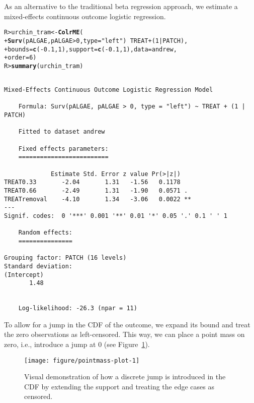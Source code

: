 \documentclass[11pt]{article}\usepackage[]{graphicx}\usepackage{xcolor}
\makeatletter
\newcommand{\hlnum}[1]{\textcolor[rgb]{0.686,0.059,0.569}{#1}}%
\newcommand{\hlstr}[1]{\textcolor[rgb]{0.192,0.494,0.8}{#1}}%
\newcommand{\hlopt}[1]{\textcolor[rgb]{0,0,0}{#1}}%
\newcommand{\hlstd}[1]{\textcolor[rgb]{0.345,0.345,0.345}{#1}}%
\newcommand{\hlkwb}[1]{\textcolor[rgb]{0.69,0.353,0.396}{#1}}%
\newcommand{\hlkwc}[1]{\textcolor[rgb]{0.333,0.667,0.333}{#1}}%
\newcommand{\hlkwd}[1]{\textcolor[rgb]{0.737,0.353,0.396}{\textbf{#1}}}%
\newenvironment{kframe}{%
 \def\at@end@of@kframe{}%
 \ifinner\ifhmode%
  \def\at@end@of@kframe{\end{minipage}}%
  \begin{minipage}{\columnwidth}%
 \fi\fi%
 \def\FrameCommand##1{\hskip\@totalleftmargin \hskip-\fboxsep
 \colorbox{shadecolor}{##1}\hskip-\fboxsep
     \hskip-\linewidth \hskip-\@totalleftmargin \hskip\columnwidth}%
 \MakeFramed {\advance\hsize-\width
   \@totalleftmargin\z@ \linewidth\hsize
   \@setminipage}}%
 {\par\unskip\endMakeFramed%
 \at@end@of@kframe}
\newenvironment{knitrout}{}{} %
\newcommand{\0}{{\mathbf{0}}}
\makeatother
\begin{document}
As an alternative to the traditional beta regression approach,
we estimate a mixed-effects continuous outcome logistic regression.
%
\begin{knitrout}\small
{}\color{fgcolor}\begin{kframe}
\begin{alltt}
\hlstd{R> }\hlstd{urchin_tram} \hlkwb{<-} \hlkwd{ColrME}\hlstd{(}
\hlstd{+  }  \hlkwd{Surv}\hlstd{(pALGAE, pALGAE} \hlopt{>} \hlnum{0}\hlstd{,} \hlkwc{type} \hlstd{=} \hlstr{"left"}\hlstd{)} \hlopt{~} \hlstd{TREAT} \hlopt{+} \hlstd{(}\hlnum{1} \hlopt{|} \hlstd{PATCH),}
\hlstd{+  }  \hlkwc{bounds} \hlstd{=} \hlkwd{c}\hlstd{(}\hlopt{-}\hlnum{0.1}\hlstd{,} \hlnum{1}\hlstd{),} \hlkwc{support} \hlstd{=} \hlkwd{c}\hlstd{(}\hlopt{-}\hlnum{0.1}\hlstd{,} \hlnum{1}\hlstd{),} \hlkwc{data} \hlstd{= andrew,}
\hlstd{+  }  \hlkwc{order} \hlstd{=} \hlnum{6}\hlstd{)}
\hlstd{R> }\hlkwd{summary}\hlstd{(urchin_tram)}
\end{alltt}
\begin{verbatim}

Mixed-Effects Continuous Outcome Logistic Regression Model

	Formula: Surv(pALGAE, pALGAE > 0, type = "left") ~ TREAT + (1 | PATCH)

	Fitted to dataset andrew  

	Fixed effects parameters:
	=========================

             Estimate Std. Error z value Pr(>|z|)   
TREAT0.33       -2.04       1.31   -1.56   0.1178   
TREAT0.66       -2.49       1.31   -1.90   0.0571 . 
TREATremoval    -4.10       1.34   -3.06   0.0022 **
---
Signif. codes:  0 '***' 0.001 '**' 0.01 '*' 0.05 '.' 0.1 ' ' 1

	Random effects:
	===============

Grouping factor: PATCH (16 levels)
Standard deviation:
(Intercept) 
       1.48 


	Log-likelihood: -26.3 (npar = 11)
\end{verbatim}
\end{kframe}
\end{knitrout}
%
To allow for a jump in the CDF of the outcome,
we expand its bound and treat the zero observations as left-censored.
This way, we can place a point mass on zero,
i.e., introduce a jump at 0
(see Figure~\ref{fig:cdf-jump}).

\begin{figure}[!ht]
  \centering

\begin{knitrout}\small
{}\color{fgcolor}
\texttt{[image: figure/pointmass-plot-1]} 
\end{knitrout}

\caption{Visual demonstration of how a discrete jump
  is introduced in the CDF by extending the support and
  treating the edge cases as censored.}\label{fig:cdf-jump}
\end{figure}
\end{document}

